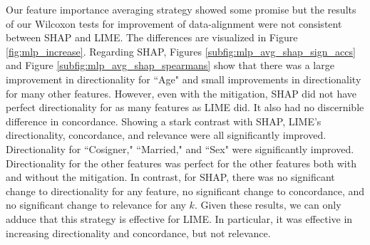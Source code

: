 \documentclass[mnsc,blindrev]{informs3}
\begin{document}
            Our feature importance averaging strategy showed some promise but the results of our Wilcoxon tests for improvement of data-alignment were not consistent between SHAP and LIME. The differences are visualized in Figure \ref{fig:mlp_increase}. 
             Regarding SHAP, Figures \ref{subfig:mlp_avg_shap_sign_accs} and Figure \ref{subfig:mlp_avg_shap_spearmans} show that there was a large improvement in directionality for ``Age" and small improvements in directionality for many other features. However, even with the mitigation, SHAP did not have perfect directionality for as many features as LIME did.  It also had no discernible difference in concordance. 
            Showing a stark contrast with SHAP, LIME's directionality, concordance, and relevance were all significantly improved. Directionality for ``Cosigner," ``Married," and ``Sex" were significantly improved. Directionality for the other features was perfect for the other features both with and without the mitigation. In contrast, for SHAP, there was no significant change to directionality for any feature, no significant change to concordance, and no significant change to relevance for any $k$.  Given these results, we can only adduce that this strategy is effective for LIME. In particular, it was effective in increasing directionality and concordance, but not relevance.  %
            
            
\end{document}
